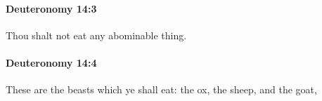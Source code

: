 		\paragraph{Deuteronomy 14:3} %
			\label{DEUTERONOMY-14-3}

			Thou shalt not eat any abominable thing.


		\paragraph{Deuteronomy 14:4} %
			\label{DEUTERONOMY-14-4}

			These are the beasts which ye shall eat: the ox, the sheep, and the goat,


